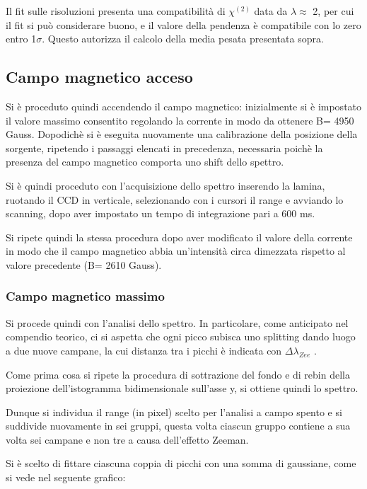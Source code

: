 \documentclass{article}
\begin{document}
	Il fit sulle risoluzioni presenta una compatibilità di $\chi^{(2)}$ data
	da $\lambda \approx$ 2, per cui il fit si può considerare buono, e il valore
	della pendenza è compatibile con lo zero entro 1$\sigma$. Questo autorizza il calcolo della media 
	pesata presentata sopra.


	\subsection*{Campo magnetico acceso}
	
	Si è proceduto quindi accendendo il campo magnetico: inizialmente si è impostato il valore massimo 
	consentito regolando la corrente in modo da ottenere B= 4950 Gauss. 
	Dopodichè si è eseguita nuovamente una calibrazione della posizione della sorgente, ripetendo i 
	passaggi elencati in precedenza, necessaria poichè la presenza del campo magnetico 
	comporta uno shift dello spettro.

	Si è quindi proceduto con l'acquisizione dello spettro inserendo la lamina, ruotando il CCD 
	in verticale, selezionando con i cursori il range e avviando lo scanning, dopo aver impostato un tempo 
	di integrazione pari a 600 ms.
	
	Si ripete quindi  la stessa procedura dopo aver modificato il valore della corrente in modo 
	che il campo magnetico abbia un'intensità circa dimezzata rispetto al valore precedente 
	(B= 2610 Gauss).
	
	\subsubsection*{Campo magnetico massimo}

	Si procede quindi con l'analisi dello spettro.
	In particolare, come anticipato nel compendio teorico, ci si aspetta che ogni picco subisca uno 
	splitting dando luogo a due nuove campane, la cui distanza tra i picchi è indicata con 
	$\Delta \lambda_{Zee} $ .
	 
	Come prima cosa si ripete la procedura di sottrazione del fondo e di rebin della proiezione 
	dell'istogramma bidimensionale sull'asse y, si ottiene quindi lo spettro.
	 
	Dunque si individua il range (in pixel) scelto per l'analisi a campo spento e si suddivide 
	nuovamente in sei gruppi, questa volta ciascun gruppo contiene a sua volta sei campane e 
	non tre a causa dell'effetto Zeeman.
	
	Si è scelto di fittare ciascuna coppia di picchi con una somma di gaussiane, come 
	si vede nel seguente grafico:
	
\end{document}
